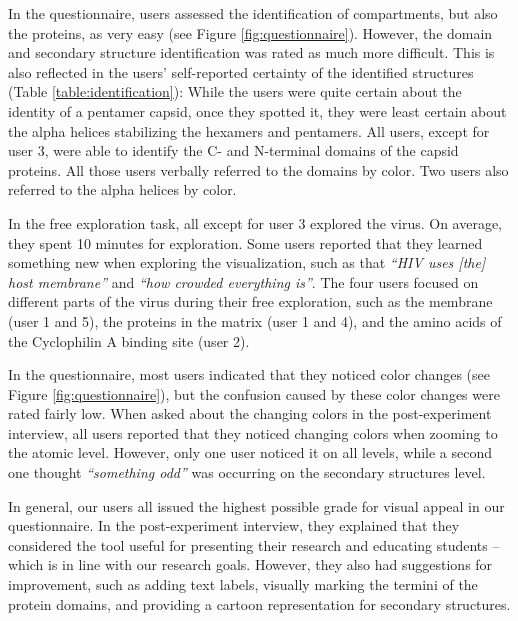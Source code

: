 \documentclass{egpubl}
\begin{document}
	 In the questionnaire, users assessed the identification of compartments, but also the proteins, as very easy  (see Figure \ref{fig:questionnaire}). 
	 However, the domain and secondary structure identification was rated as much more difficult. 
	 This is also reflected in the users' self-reported certainty of the identified structures (Table \ref{table:identification}): 
	 While the users were quite certain about the identity of a pentamer capsid, once they spotted it, they were least certain about the alpha helices stabilizing the hexamers and pentamers. 
	 All users, except for user 3, were able to identify the C- and N-terminal domains of the capsid proteins. 
	 All those users verbally referred to the domains by color. 
	 Two users also referred to the alpha helices by color. 
	 
	

In the free exploration task, all except for user 3 explored the virus. 
On average, they spent 10 minutes for exploration. 
Some users reported that they learned something new when exploring the visualization, such as that \textit{``HIV uses [the] host membrane''} and \textit{``how crowded everything is''}. 
The four users focused on different parts of the virus during their free exploration, such as the membrane (user 1 and 5), the proteins in the matrix (user 1 and 4), and the amino acids of the Cyclophilin A binding site (user 2). 

In the questionnaire, most users indicated that they noticed color changes (see Figure \ref{fig:questionnaire}), but the confusion caused by these color changes were rated fairly low. 
When asked about the changing colors in the post-experiment interview, all users reported that they noticed changing colors when zooming to the atomic level. 
However, only one user noticed it on all levels, while a second one thought \textit{``something odd''} was occurring on the secondary structures level. 

In general, our users all issued the highest possible grade for visual appeal in our questionnaire. 
In the post-experiment interview, they explained that they considered the tool useful for presenting their research and educating students -- which is in line with our research goals. 
However, they also had suggestions for improvement, such as adding text labels, visually marking the termini of the protein domains, and providing a cartoon representation for secondary structures. 
\end{document}
